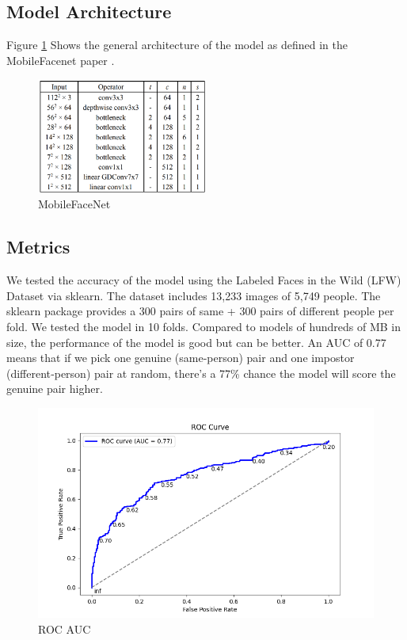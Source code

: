 \subsection{Model Architecture}
Figure \ref{fig:mfn_arch} Shows the general architecture of the model as defined in the MobileFacenet paper \cite{chen2018mobilefacenets}.
\begin{figure}[h] %
	\centering
	\includegraphics[width=0.5\textwidth]{figures/chapter4/mfn_arch.png} %
	\caption{MobileFaceNet}
	\label{fig:mfn_arch}
\end{figure}

\clearpage 
\subsection{Metrics}
We tested the accuracy of the model using the Labeled Faces in the Wild (LFW) Dataset via sklearn. The dataset includes 13,233 images of 5,749 people. The sklearn package provides a 300 pairs of same + 300 pairs of different people per fold. We tested the model in 10 folds.
Compared to models of hundreds of MB in size, the performance of the model is good but can be better. An AUC of 0.77 means that if we pick one genuine (same‐person) pair and one impostor (different‐person) pair at random, there’s a 77\% chance the model will score the genuine pair higher.
\begin{figure}[h] %
	\centering
	\includegraphics[width=1\textwidth]{figures/chapter4/roc_curve.png} %
	\caption{ROC AUC}
	\label{fig:roc_curve}
\end{figure}


